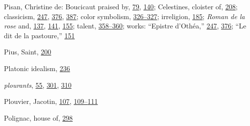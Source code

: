 Pisan, Christine de: Boucicaut praised by,
\protect\hyperlink{10_Chapter_Three__THE_HEROIC_DREAM.xhtmlux5cux23page_79}{79},
\protect\hyperlink{11_Chapter_Four__THE_FORMS_OF_LOVE.xhtmlux5cux23page_140}{140};
Celestines, cloister of,
\protect\hyperlink{14_Chapter_Seven__THE_PIOUS_PERSONA.xhtmlux5cux23page_208}{208};
classicism,
\protect\hyperlink{16_Chapter_Nine__THE_DECLINE_OF_SYM.xhtmlux5cux23page_247}{247},
\protect\hyperlink{21_Chapter_Thirteen__IMAGE_AND_WORD.xhtmlux5cux23page_376}{376},
\protect\hyperlink{22_Chapter_Fourteen__THE_COMING_OF.xhtmlux5cux23page_387}{387};
color symbolism,
\protect\hyperlink{20_ILLUSTRATIONS_FOLLOW_PAGE.xhtmlux5cux23page_326}{326--}\protect\hyperlink{20_ILLUSTRATIONS_FOLLOW_PAGE.xhtmlux5cux23page_327}{327};
irreligion,
\protect\hyperlink{13_Chapter_Six__THE_DEPICTION_OF_TH.xhtmlux5cux23page_185}{185};
\emph{Roman de la rose} and,
\protect\hyperlink{11_Chapter_Four__THE_FORMS_OF_LOVE.xhtmlux5cux23page_137}{137},
\protect\hyperlink{11_Chapter_Four__THE_FORMS_OF_LOVE.xhtmlux5cux23page_141}{141},
\protect\hyperlink{11_Chapter_Four__THE_FORMS_OF_LOVE.xhtmlux5cux23page_155}{155};
talent,
\protect\hyperlink{21_Chapter_Thirteen__IMAGE_AND_WORD.xhtmlux5cux23page_358}{358--}\protect\hyperlink{21_Chapter_Thirteen__IMAGE_AND_WORD.xhtmlux5cux23page_360}{360};
works: ``Epistre d'Othéa,''
\protect\hyperlink{16_Chapter_Nine__THE_DECLINE_OF_SYM.xhtmlux5cux23page_247}{247},
\protect\hyperlink{21_Chapter_Thirteen__IMAGE_AND_WORD.xhtmlux5cux23page_376}{376};
``Le dit de la pastoure,''
\protect\hyperlink{11_Chapter_Four__THE_FORMS_OF_LOVE.xhtmlux5cux23page_151}{151}

Pius, Saint,
\protect\hyperlink{13_Chapter_Six__THE_DEPICTION_OF_TH.xhtmlux5cux23page_200}{200}

Platonic idealism,
\protect\hyperlink{16_Chapter_Nine__THE_DECLINE_OF_SYM.xhtmlux5cux23page_236}{236}

\emph{plourants},
\protect\hyperlink{09_Chapter_Two__THE_CRAVING_FOR_A_M.xhtmlux5cux23page_55}{55},
\protect\hyperlink{20_ILLUSTRATIONS_FOLLOW_PAGE.xhtmlux5cux23page_301}{301},
\protect\hyperlink{20_ILLUSTRATIONS_FOLLOW_PAGE.xhtmlux5cux23page_310}{310}

Plouvier, Jacotin,
\protect\hyperlink{10_Chapter_Three__THE_HEROIC_DREAM.xhtmlux5cux23page_107}{107},
\protect\hyperlink{10_Chapter_Three__THE_HEROIC_DREAM.xhtmlux5cux23page_109}{109--}\protect\hyperlink{10_Chapter_Three__THE_HEROIC_DREAM.xhtmlux5cux23page_111}{111}

Polignac, house of,
\protect\hyperlink{20_ILLUSTRATIONS_FOLLOW_PAGE.xhtmlux5cux23page_298}{298}

